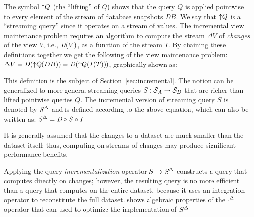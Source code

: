 \begin{center}
\end{center}

The symbol ${\uparrow}Q$ (the ``lifting'' of $Q$) shows that the query $Q$ is applied
pointwise to every element of the stream of database snapshots $DB$.  We say that
${\uparrow}Q$ is a ``streaming query'' since it operates on a stream of values.
The incremental view maintenance problem requires an algorithm to  
compute the stream $\Delta V$ of \emph{changes} of the view $V$, i.e., $\mathit{D}(V)$,
as a function of the stream $T$.  
By chaining these definitions together we get the following 
of the view maintenance problem: $\Delta V = \mathit{D}({\uparrow}Q(DB)) = \mathit{D}({\uparrow}Q(\mathit{I}(T)))$,
graphically shown as:

\begin{center}
\end{center}

This definition is the subject of Section~\ref{sec:incremental}.
The notion can be generalized to more general streaming queries
$S: \mathcal{S}_{A} \to \mathcal{S}_{B}$ that are richer than lifted pointwise queries $Q$.
The incremental version of streaming query $S$ is denoted by ${S}^{\Delta}$ and is defined
according to the above equation, which can also be written as: ${S}^{\Delta} = \mathit{D} \circ S \circ \mathit{I}$. 

It is generally assumed that the changes to a dataset are much smaller than
the dataset itself; thus, computing on streams of changes may
produce significant performance benefits.

Applying the query \emph{incrementalization} operator $S \mapsto {S}^{\Delta}$ constructs
a query that computes directly on changes; however, the resulting query is no more
efficient than a query that computes on the entire dataset, because it uses an
integration operator to reconstitute the full dataset.
 shows algebraic properties of the ${\cdot}^{\Delta}$ operator 
that can used to optimize the implementation of ${S}^{\Delta}$:

